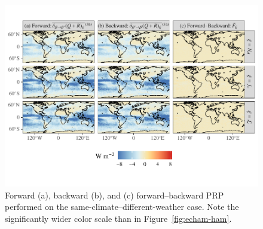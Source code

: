 \documentclass[acp, manuscript]{copernicus}\usepackage[]{graphicx}\usepackage[]{color}
\begin{document}
\begin{figure}[t]
  \centering
  


{\centering \includegraphics[width=\textwidth]{figure/erf-prp-erf-fw-1} 

}



  \caption{Forward (a), backward (b), and (c) forward--backward PRP performed on the
    same-climate--different-weather case.  Note the significantly wider color scale than in Figure~\ref{fig:echam-ham}.}
  \label{fig:fw-bk}
\end{figure}


% 
%
%
%
%
%
%

\clearpage
\end{document}
